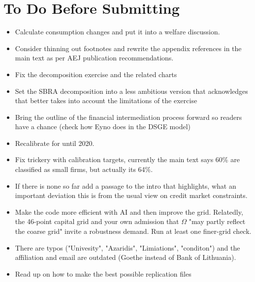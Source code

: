 \documentclass[12pt]{article}
\begin{document}
\newpage

\section{To Do Before Submitting}
\begin{itemize} \setlength\itemsep{0em}  \small
    \item Calculate consumption changes and put it into a welfare discussion.
    \item Consider thinning out footnotes and rewrite the appendix references in the main text as per AEJ publication recommendations.
    \item Fix the decomposition exercise and the related charts
    \item Set the SBRA decomposition into a less ambitious version that acknowledges that better takes into account the limitations of the exercise
    \item Bring the outline of the financial intermediation process forward so readers have a chance (check how Eyno does in the DSGE model)
    \item Recalibrate for until 2020.
    \item Fix trickery with calibration targets, currently the main text says 60\% are classified as small firms, but actually its 64\%.
    \item If there is none so far add a passage to the intro that highlights, what an important deviation this is from the usual view on credit market constraints.
    \item Make the code more efficient with AI and then improve the grid. Relatedly, the 46-point capital grid and your own admission that $\Omega$ "may partly reflect the coarse grid" invite a robustness demand. Run at least one finer-grid check.
    \item There are typos ("Univesity", "Azaridis", "Limiations", "conditon") and the affiliation and email are outdated (Goethe instead of Bank of Lithuania).    
    \item Read up on how to make the best possible replication files
\end{itemize} \normalsize
\end{document}
